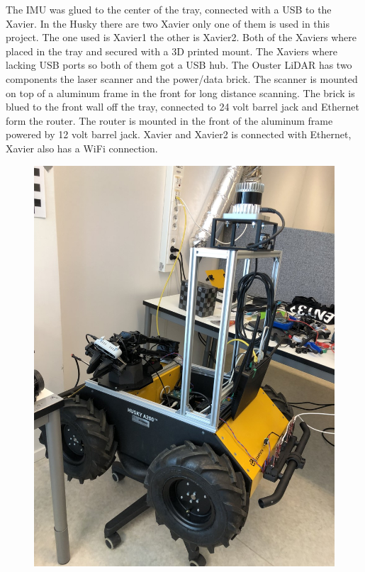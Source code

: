 The IMU was glued to the center of the tray, connected with a USB to the Xavier. 
In the Husky there are two Xavier only one of them is used in this project. The one used is Xavier1 the other is Xavier2. Both of the Xaviers where placed in the tray and secured with a 3D printed mount. The Xaviers where lacking USB ports so both of them got a USB hub. 
The Ouster LiDAR has two components the laser scanner and the power/data brick. The scanner is mounted on top of a aluminum frame in the front for long distance scanning. The brick is blued to the front wall off the tray, connected to 24 volt barrel jack and Ethernet form the router. 
The router is mounted in the front of the aluminum frame powered by 12 volt barrel jack. Xavier and Xavier2 is connected with Ethernet, Xavier also has a WiFi connection. 
\begin{figure}[H]
  \centering
  \begin{minipage}[b]{0.4\textwidth}
    \includegraphics[width=\textwidth]{Figures/images/husky_irl.jpg}

\end{minipage}
\end{figure}
